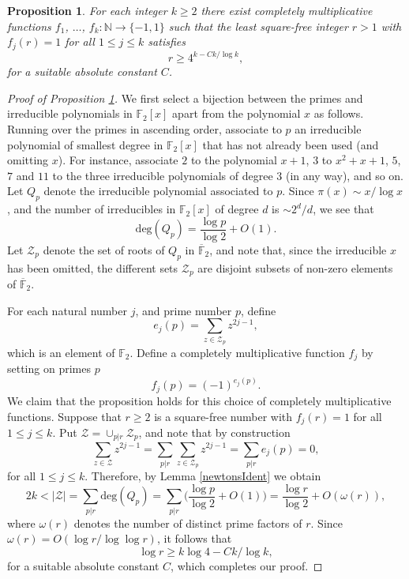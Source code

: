 \documentclass[10pt,a4paper]{amsart}
\newtheorem{prop}{Proposition}
\begin{document}
\begin{prop} \label{prop2.1}  For each integer $k\ge 2$ there exist completely multiplicative functions $f_1$, $\ldots$, $f_k : {\mathbb N} \to \{-1,1\}$ such that the least square-free integer $r>1$ with $f_j(r)=1$ for all $1\le j\le k$ satisfies 
$$ 
r \ge 4^{k-Ck/\log k}, 
$$
for a suitable absolute constant $C$. 
\end{prop} 

\begin{proof}[Proof of Proposition \ref{prop2.1}]   We first select a bijection between the primes and irreducible polynomials in ${\mathbb F}_2[x]$ apart from the polynomial $x$ as follows.  Running over the primes in ascending order, associate to $p$ an irreducible polynomial of smallest degree in ${\mathbb F}_2[x]$ that has not already been used (and omitting $x$).  For instance, associate $2$ to the polynomial $x+1$, $3$ to $x^2+x+1$, $5$, $7$ and $11$ to the three irreducible polynomials of degree $3$ (in any way), and so on.  Let $Q_p$ denote the irreducible polynomial associated to $p$.  Since $\pi(x) \sim x/\log x$, and the number of irreducibles in ${\mathbb F}_2[x]$ of degree $d$ is $\sim 2^d/d$, we see that 
$$ 
\text{deg}(Q_p) = \frac{\log p}{\log 2} + O(1). 
$$
Let ${\mathcal Z}_p$ denote the set of roots of $Q_p$ in $\overline{\mathbb F}_2$, and note that, since the irreducible $x$ has been omitted, the different sets ${\mathcal Z}_p$ are disjoint subsets of non-zero elements of $\overline{\mathbb F}_2$.  

For each natural number $j$, and prime number $p$, define 
$$
e_j(p) = \sum_{z\in {\mathcal Z}_p} z^{2j-1},  
$$
which is an element of ${\mathbb F}_2$.   Define a completely multiplicative function $f_j$ by setting on primes $p$
$$ 
f_j(p) = (-1)^{e_j(p)}.  
$$
We claim that the proposition holds for this choice of completely multiplicative functions.  Suppose that $r\ge 2$ is a square-free number with $f_j(r)=1$ for all $1\le j\le k$.  Put ${\mathcal Z} =\cup_{p|r} {\mathcal Z}_p$, and note that by construction 
$$
\sum_{z\in \mathcal{Z}} z^{2j-1} = \sum_{p|r} \sum_{z\in \mathcal{Z}_p} z^{2j-1} = \sum_{p|r} e_j(p) = 0, 
$$
for all $1\le j\le k$.   Therefore, by Lemma \ref{newtonsIdent} we obtain 
$$ 
2k < |{\mathcal Z}| = \sum_{p|r} \text{deg} (Q_p) = \sum_{p|r} \Big(\frac{\log p}{\log 2} + O(1)\Big) = \frac{\log r}{\log 2} + O(\omega(r)),  
$$
where $\omega(r)$ denotes the number of distinct prime factors of $r$.  Since $\omega(r) =O(\log r/\log \log r)$, it follows that 
$$ 
\log r \ge k\log 4 - Ck/\log k,
$$
for a suitable absolute constant $C$, which completes our proof. 
\end{proof}
\end{document}
